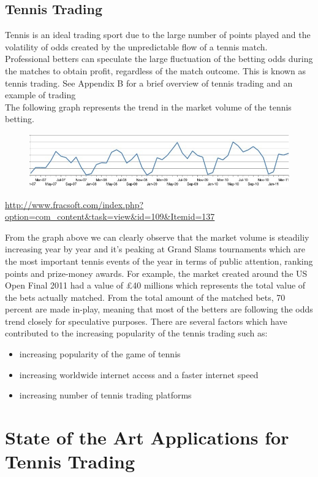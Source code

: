 \documentclass[10pt]{report}
\begin{document}
\subsection{Tennis Trading}

Tennis is an ideal trading sport due to the large number of points played and the volatility of odds created
by the unpredictable flow of a tennis match. Professional betters can speculate the large
fluctuation of the betting odds during the matches to obtain profit, regardless of
the match outcome. This is known as tennis trading. See Appendix B for a brief overview of tennis trading and an example of trading\\
The following graph represents the trend in the market volume of the tennis betting.

\begin{figure}[ht]
\centering
\includegraphics[scale=0.4]{bftennis.jpg}
\caption{}
\end{figure}
\url {http://www.fracsoft.com/index.php?option=com_content&task=view&id=109&Itemid=137}

From the graph above we can clearly observe that the market volume is steadiliy increasing year by year and it's peaking at 
Grand Slams tournaments which are the most important tennis events of the year in terms of public attention, ranking points and prize-money awards.
For example, the market created around the US Open Final 2011 had a value of \pounds40 millions which represents the total value of the bets actually matched.
From the total amount of the matched bets, 70 percent are made in-play, meaning that most of the betters are following the odds trend closely for 
speculative purposes. 
There are several factors which have contributed to the increasing popularity of the tennis trading such as:
\begin{itemize}
\item increasing popularity of the game of tennis 
\item increasing worldwide internet access and a faster internet speed  
\item increasing number of tennis trading platforms
\end{itemize}


\section{State of the Art Applications for Tennis Trading}
\end{document}
